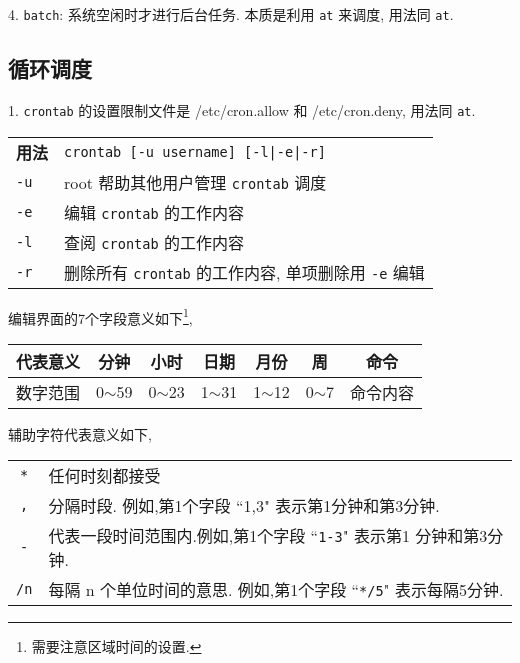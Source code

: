 \par
4. \texttt{batch}: 系统空闲时才进行后台任务. 本质是利用 \texttt{at} 来调度, 用法同 \texttt{at}.

\subsection{循环调度}
\par
1. \texttt{crontab} 的设置限制文件是 /etc/cron.allow 和 /etc/cron.deny, 用法同 \texttt{at}.
\begin{longtable}{l@{ : }p{}}\hline\hline

    \textbf{用法} & \verb"crontab [-u username] [-l|-e|-r]"  \\

    \texttt{-u} & root 帮助其他用户管理 \texttt{crontab} 调度\\

    \texttt{-e} & 编辑 \texttt{crontab} 的工作内容\\

    \texttt{-l} & 查阅 \texttt{crontab} 的工作内容\\

    \texttt{-r} & 删除所有 \texttt{crontab} 的工作内容, 单项删除用 \texttt{-e} 编辑\\


    \hline
\end{longtable}
编辑界面的7个字段意义如下\footnote[1]{需要注意区域时间的设置.},
\begin{longtable}{c|c|c|c|c|c|c}\hline

    代表意义 & 分钟 & 小时 & 日期 & 月份 & 周 & 命令 \\\hline
    
    数字范围 & 0$\sim$59 & 0$\sim$23 & 1$\sim$31 & 1$\sim$12 & 0$\sim$7 & 命令内容 \\

    \hline
\end{longtable}
辅助字符代表意义如下,
\begin{longtable}{c@{ : }p{}}\hline

    \verb|*| & 任何时刻都接受\\
    
    \verb|,| & 分隔时段. 例如,第1个字段 ``1,3" 表示第1分钟和第3分钟.\\
    
    \verb|-| & 代表一段时间范围内.例如,第1个字段 ``\texttt{1-3}" 表示第1 分钟和第3分钟.\\
    
    \verb|/n| & 每隔 n 个单位时间的意思. 例如,第1个字段 ``\texttt{*/5}" 表示每隔5分钟.\\

    \hline
\end{longtable}

